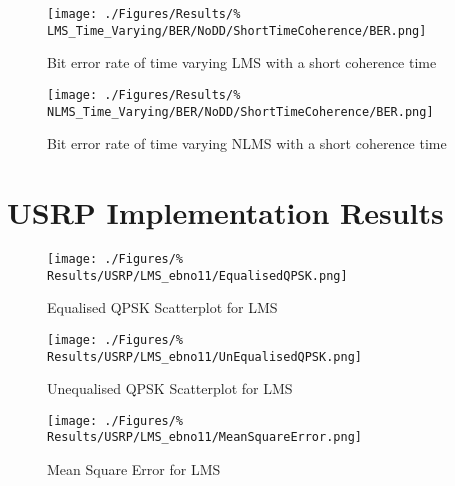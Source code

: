 \begin{figure}[ht]
	\centering
	\begin{minipage}{0.49\textwidth}
		\centering
		\texttt{[image: ./Figures/Results/\%
	LMS\_Time\_Varying/BER/NoDD/ShortTimeCoherence/BER.png]}
		\captionsetup{width=0.75\linewidth}
		\caption{Bit error rate of time varying LMS with a 
		short coherence time}
	\end{minipage}
	\begin{minipage}{0.49\textwidth}
		\centering
		\texttt{[image: ./Figures/Results/\%
	NLMS\_Time\_Varying/BER/NoDD/ShortTimeCoherence/BER.png]}
		\captionsetup{width=0.75\linewidth}
		\caption{Bit error rate of time varying NLMS with a 
		short coherence time}
	\end{minipage}
\end{figure}

\section{USRP Implementation Results}
\label{sec:USRPResults}
\FloatBarrier

\begin{figure}[ht]
	\centering
	\begin{minipage}{0.49\textwidth}
		\centering
		\texttt{[image: ./Figures/\%
		Results/USRP/LMS\_ebno11/EqualisedQPSK.png]}
		\captionsetup{width=0.75\linewidth}
		\caption{Equalised QPSK Scatterplot for LMS}
	\end{minipage}
	\begin{minipage}{0.49\textwidth}
		\centering
		\texttt{[image: ./Figures/\%
		Results/USRP/LMS\_ebno11/UnEqualisedQPSK.png]}
		\captionsetup{width=0.75\linewidth}
		\caption{Unequalised QPSK Scatterplot for LMS}
	\end{minipage}
\end{figure}
\begin{figure}[ht]
	\centering
	\texttt{[image: ./Figures/\%
	Results/USRP/LMS\_ebno11/MeanSquareError.png]}
	\captionsetup{width=0.75\linewidth}
	\caption{Mean Square Error for LMS}
\end{figure}

